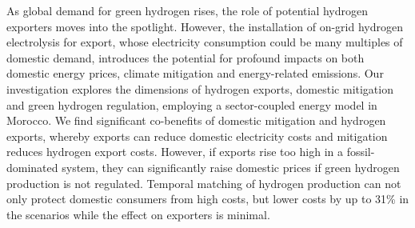 




As global demand for green hydrogen rises, the role of potential hydrogen exporters moves into the spotlight.
However, the installation of on-grid hydrogen electrolysis for export, whose electricity consumption could be many multiples of domestic demand, introduces the potential for profound impacts on both domestic energy prices, climate mitigation and energy-related emissions. Our investigation explores the dimensions of hydrogen exports, domestic mitigation and green hydrogen regulation, employing a sector-coupled energy model in Morocco. 
We find significant co-benefits of domestic mitigation and hydrogen exports, whereby exports can reduce domestic electricity costs and mitigation reduces hydrogen export costs.
However, if exports rise too high in a fossil-dominated system, they can significantly raise domestic prices if green hydrogen production is not regulated.
Temporal matching of hydrogen production can not only protect domestic consumers from high costs, but lower costs by up to 31\% in the scenarios while the effect on exporters is minimal.


